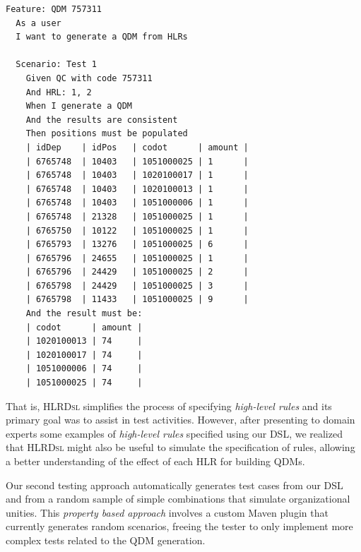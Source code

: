 \documentclass[AMA,STIX1COL]{WileyNJD-v2}
\newcommand{\callers}{\emph{high-level rules}\xspace}
\newcommand{\shc}{HLR\xspace}
\newcommand{\hlrdsl}{\textsc{HLRDsl}\xspace}
\begin{document}
\begin{lstlisting}[frame=single, language=Cucumber, caption={\it Cucumber feature}, label={code:cucumber}]
Feature: QDM 757311
  As a user
  I want to generate a QDM from HLRs

  Scenario: Test 1
    Given QC with code 757311
    And HRL: 1, 2
    When I generate a QDM
    And the results are consistent
    Then positions must be populated
    | idDep    | idPos   | codot      | amount |
    | 6765748  | 10403   | 1051000025 | 1      |
    | 6765748  | 10403   | 1020100017 | 1      |
    | 6765748  | 10403   | 1020100013 | 1      |
    | 6765748  | 10403   | 1051000006 | 1      |
    | 6765748  | 21328   | 1051000025 | 1      |
    | 6765750  | 10122   | 1051000025 | 1      |    
    | 6765793  | 13276   | 1051000025 | 6      |
    | 6765796  | 24655   | 1051000025 | 1      |
    | 6765796  | 24429   | 1051000025 | 2      |
    | 6765798  | 24429   | 1051000025 | 3      |
    | 6765798  | 11433   | 1051000025 | 9      |   
    And the result must be:
    | codot      | amount |
    | 1020100013 | 74     |
    | 1020100017 | 74     |
    | 1051000006 | 74     |
    | 1051000025 | 74     |
\end{lstlisting}



That is, \hlrdsl simplifies the process of specifying \callers and its primary goal was to assist in
test activities. However, after presenting to domain experts some examples of \callers specified using our DSL,
we realized that \hlrdsl might also be useful to simulate the specification of rules,
allowing a better understanding of the effect of each \shc for building QDMs.

Our second testing approach automatically generates test cases from our DSL and from a random sample of simple combinations that simulate organizational unities. This \emph{property based approach} involves a custom Maven plugin that currently generates random scenarios, freeing the tester to only implement more complex tests related to the QDM generation. 

\end{document}
